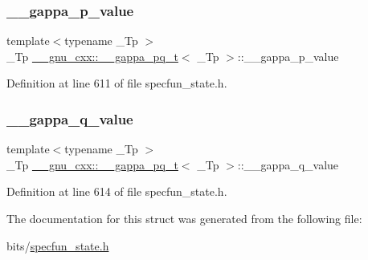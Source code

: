 \subsubsection{\texorpdfstring{\+\_\+\+\_\+gappa\+\_\+p\+\_\+value}{\_\_gappa\_p\_value}}
{\footnotesize\ttfamily template$<$typename \+\_\+\+Tp $>$ \\
\+\_\+\+Tp \hyperlink{struct____gnu__cxx_1_1____gappa__pq__t}{\+\_\+\+\_\+gnu\+\_\+cxx\+::\+\_\+\+\_\+gappa\+\_\+pq\+\_\+t}$<$ \+\_\+\+Tp $>$\+::\+\_\+\+\_\+gappa\+\_\+p\+\_\+value}



Definition at line 611 of file specfun\+\_\+state.\+h.

\mbox{\label{struct____gnu__cxx_1_1____gappa__pq__t_afd7d83a4e618ca4b710c952638951714}} 
\subsubsection{\texorpdfstring{\+\_\+\+\_\+gappa\+\_\+q\+\_\+value}{\_\_gappa\_q\_value}}
{\footnotesize\ttfamily template$<$typename \+\_\+\+Tp $>$ \\
\+\_\+\+Tp \hyperlink{struct____gnu__cxx_1_1____gappa__pq__t}{\+\_\+\+\_\+gnu\+\_\+cxx\+::\+\_\+\+\_\+gappa\+\_\+pq\+\_\+t}$<$ \+\_\+\+Tp $>$\+::\+\_\+\+\_\+gappa\+\_\+q\+\_\+value}



Definition at line 614 of file specfun\+\_\+state.\+h.



The documentation for this struct was generated from the following file\+:\begin{DoxyCompactItemize}
\item 
bits/\hyperlink{specfun__state_8h}{specfun\+\_\+state.\+h}\end{DoxyCompactItemize}
